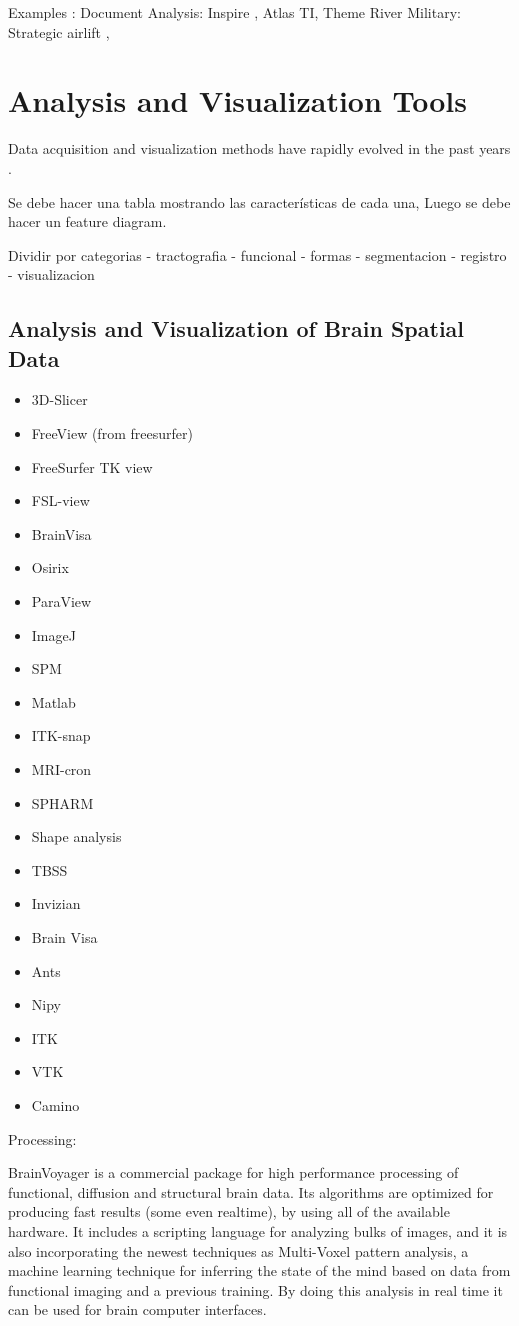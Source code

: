Examples : 
Document Analysis: Inspire \autocite{hetzler_analysis_2004}, Atlas TI, Theme River \autocite{themerivertm:_2002}
Military: Strategic airlift \autocite{soban_visual_2011},


\section{Analysis and Visualization Tools}

Data acquisition and visualization methods have rapidly evolved in the past years \autocite{botha_individual_2012}.

Se debe hacer una tabla mostrando las características de cada una,
Luego se debe hacer un feature diagram.

Dividir por categorias
- tractografia
- funcional
- formas
- segmentacion
- registro
- visualizacion

\subsection{Analysis and Visualization of Brain Spatial Data}
\begin{itemize}
	\item 3D-Slicer
	\item FreeView (from freesurfer)
	\item FreeSurfer TK view
	\item FSL-view
	\item BrainVisa
	\item Osirix
	\item ParaView
	\item ImageJ
	\item SPM
	\item Matlab
	\item ITK-snap
	\item MRI-cron
	\item SPHARM
	\item Shape analysis	
	\item TBSS
	\item Invizian
	\item Brain Visa
	\item Ants
	\item Nipy
	\item ITK
	\item VTK
	\item Camino
\end{itemize}


Processing:

BrainVoyager \autocite{goebel_brainvoyagerpast_2012} is a commercial package for high performance processing of functional, diffusion and structural brain data. Its algorithms are optimized for producing fast results (some even realtime), by using all of the available hardware. It includes a scripting language for analyzing bulks of images, and it is also incorporating the newest techniques as Multi-Voxel pattern analysis, a machine learning technique for inferring the state of the mind based on data from functional imaging and a previous training. By doing this analysis in real time it can be used for brain computer interfaces. 


